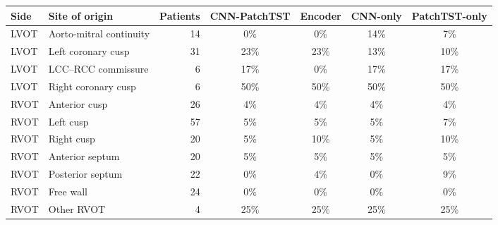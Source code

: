 \begin{tabular}{llrcccc}
\toprule
Side & Site of origin & Patients & CNN-PatchTST & Encoder & CNN-only & PatchTST-only \\
\midrule
LVOT & Aorto-mitral continuity & 14 & 0\% & 0\% & 14\% & 7\% \\
LVOT & Left coronary cusp & 31 & 23\% & 23\% & 13\% & 10\% \\
LVOT & LCC--RCC commissure & 6 & 17\% & 0\% & 17\% & 17\% \\
LVOT & Right coronary cusp & 6 & 50\% & 50\% & 50\% & 50\% \\
RVOT & Anterior cusp & 26 & 4\% & 4\% & 4\% & 4\% \\
RVOT & Left cusp & 57 & 5\% & 5\% & 5\% & 7\% \\
RVOT & Right cusp & 20 & 5\% & 10\% & 5\% & 10\% \\
RVOT & Anterior septum & 20 & 5\% & 5\% & 5\% & 5\% \\
RVOT & Posterior septum & 22 & 0\% & 4\% & 0\% & 9\% \\
RVOT & Free wall & 24 & 0\% & 0\% & 0\% & 0\% \\
RVOT & Other RVOT & 4 & 25\% & 25\% & 25\% & 25\% \\
\bottomrule
\end{tabular}
